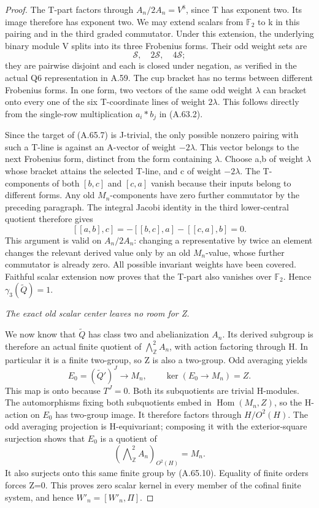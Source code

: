 \begin{proof}
The T-part factors through \(A_n/2A_n=V^8\), since T has exponent
two. Its image therefore has exponent two. We may extend scalars
from \(\mathbb F_2\) to k in this pairing and in the third graded
commutator. Under this extension, the underlying binary module V
splits into its three Frobenius forms. Their odd weight sets are
\[
 \mathcal S,\quad2\mathcal S,\quad4\mathcal S;
 \tag{A.65.8}
\]
they are pairwise disjoint and each is closed under negation, as
verified in the actual Q6 representation in A.59. The cup bracket
has no terms between different Frobenius forms. In one form, two
vectors of the same odd weight \(\lambda\) can bracket onto every
one of the six T-coordinate lines of weight \(2\lambda\).
This follows directly from the single-row multiplication
\(a_i*b_j\) in (A.63.2).

Since the target of (A.65.7) is J-trivial, the only possible
nonzero pairing with such a T-line is against an A-vector of
weight \(-2\lambda\). This vector belongs to the next Frobenius
form, distinct from the form containing \(\lambda\). Choose a,b
of weight \(\lambda\) whose bracket attains the selected T-line,
and c of weight \(-2\lambda\). The T-components of both
\([b,c]\) and \([c,a]\) vanish because their inputs belong to
different forms. Any old \(M_n\)-components have zero further
commutator by the preceding paragraph. The integral Jacobi identity
in the third lower-central quotient therefore gives
\[
 [[a,b],c]
   =-[[b,c],a]-[[c,a],b]=0.
 \tag{A.65.9}
\]
This argument is valid on \(A_n/2A_n\): changing a representative
by twice an element changes the relevant derived value only by
an old \(M_n\)-value, whose further commutator is already zero.
All possible invariant weights have been covered. Faithful scalar
extension now proves that the T-part also vanishes over
\(\mathbb F_2\). Hence \(\gamma_3(\widetilde Q)=1\).

\emph{The exact old scalar center leaves no room for Z.}\par
We now know that \(\widetilde Q\) has class two and abelianization
\(A_n\). Its derived subgroup is therefore an actual finite
quotient of
\(\bigwedge^2_{\mathbb Z}A_n\), with action factoring through H.
In particular it is a finite two-group, so Z is also a two-group.
Odd averaging yields
\[
 E_0=(\widetilde Q')^J\longrightarrow M_n,
 \qquad\ker(E_0\longrightarrow M_n)=Z.
 \tag{A.65.10}
\]
This map is onto because \(T^J=0\). Both its subquotients are
trivial H-modules. The automorphisms fixing both subquotients embed
in \(\operatorname{Hom}(M_n,Z)\), so the H-action on \(E_0\)
has two-group image. It therefore factors through \(H/O^2(H)\).
The odd averaging projection is H-equivariant; composing it with
the exterior-square surjection shows that \(E_0\) is a quotient of
\[
 (\bigwedge\nolimits^2_{\mathbb Z}A_n)_{O^2(H)}=M_n.
 \tag{A.65.11}
\]
It also surjects onto this same finite group by (A.65.10).
Equality of finite orders forces Z=0. This proves zero scalar
kernel in every member of the cofinal finite system, and hence
\(W'_n=[W'_n,\Pi]\).


\end{proof}
